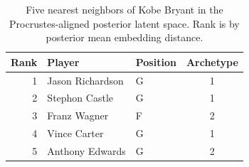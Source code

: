 \begin{table}[htbp]
  \centering\small
  \begin{tabular}{rllc}
    \toprule
    Rank & Player & Position & Archetype \\
    \midrule
    1 & Jason Richardson & G & 1 \\
    2 & Stephon Castle & G & 1 \\
    3 & Franz Wagner & F & 2 \\
    4 & Vince Carter & G & 1 \\
    5 & Anthony Edwards & G & 2 \\
    \bottomrule
  \end{tabular}
  \caption{Five nearest neighbors of Kobe Bryant in the Procrustes-aligned posterior latent space. Rank is by posterior mean embedding distance.}
  \label{tab:Kobe_Bryant_neighbors}
\end{table}

